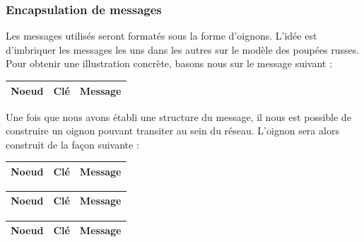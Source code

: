 \documentclass[letterpaper]{article}
\begin{document}
\subsubsection{Encapsulation de messages}
Les messages utilisés seront formatés sous la forme d'oignons. L'idée est d'imbriquer les messages les uns dans les autres sur le modèle des poupées russes. Pour obtenir une illustration concrète, basons nous sur le message suivant : 	
\begin{table}[!htbp]
\centering
\begin{tabular}{|l|l|l|}
\hline
Noeud & Clé & Message \\ \hline
\end{tabular}
\end{table}
\newline
Une fois que nous avons établi une structure du message, il nous est possible de construire un oignon pouvant transiter au sein du réseau. L'oignon sera alors construit de la façon suivante : \\
\begin{table}[!htbp]
\centering
\begin{tabular}{|l|l|l|}
\hline
Noeud & Clé & Message \\ \hline
\end{tabular}
\end{table}
\begin{table}[!htbp]
\centering
\begin{tabular}{|l|l|l|}
\hline
Noeud & Clé & Message \\ \hline
\end{tabular}
\end{table}
\begin{table}[!htbp]
\centering
\begin{tabular}{|l|l|l|}
\hline
Noeud & Clé & Message \\ \hline
\end{tabular}
\end{table}
\end{document}
